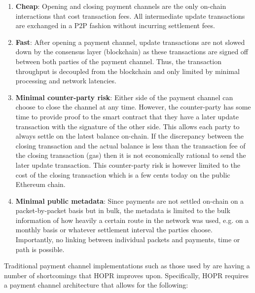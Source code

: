 \documentclass{article}
\newcommand{\MYhref}[3][blue]{\href{#2}{\color{#1}{#3}}}%
\begin{document}
\begin{enumerate}
    \item \textbf{Cheap}: Opening and closing payment channels are the only on-chain interactions that cost transaction fees. All intermediate update transactions are exchanged in a P2P fashion without incurring settlement fees.
    \item \textbf{Fast}: After opening a payment channel, update transactions are not slowed down by the consensus layer (blockchain) as these transactions are signed off between both parties of the payment channel. Thus, the transaction throughput is decoupled from the blockchain and only limited by minimal processing and network latencies.
    \item \textbf{Minimal counter-party risk}: Either side of the payment channel can choose to close the channel at any time. However, the counter-party has some time to provide proof to the smart contract that they have a later update transaction with the signature of the other side. This allows each party to always settle on the latest balance on-chain. If the discrepancy between the closing transaction and the actual balance is less than the transaction fee of the closing transaction (gas) then it is not economically rational to send the later update transaction. This counter-party risk is however limited to the cost of the closing transaction which is a few cents today on the public Ethereum chain.
    \item \textbf{Minimal public metadata}: Since payments are not settled on-chain on a packet-by-packet basis but in bulk, the metadata is limited to the bulk information of how heavily a certain route in the network was used, e.g. on a monthly basis or whatever settlement interval the parties choose. Importantly, no linking between individual packets and payments, time or path is possible.
\end{enumerate}

\noindent Traditional payment channel implementations such as those used by \MYhref{http://raiden.network}{Raiden} are having a number of shortcomings that HOPR improves upon. Specifically, HOPR requires a payment channel architecture that allows for the following:
\end{document}

